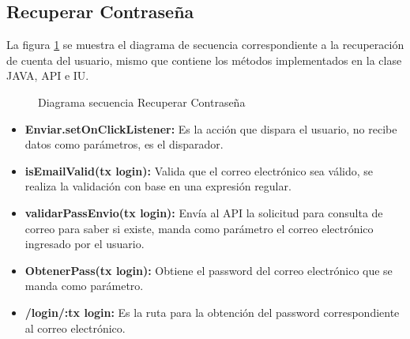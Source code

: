 \subsection{Recuperar Contraseña}

La figura \ref{fig:SecuenciaRecupera} se muestra el diagrama de secuencia correspondiente a la recuperación de cuenta del usuario, mismo que contiene los métodos implementados en la clase JAVA, API e IU.

\begin{figure}[htbp!]
	\centering
	\caption{Diagrama secuencia Recuperar Contraseña}
	\label{fig:SecuenciaRecupera}
\end{figure}

\begin{itemize}
	\item \textbf{Enviar.setOnClickListener:} Es la acción que dispara el usuario, no recibe datos como parámetros, es el disparador.
	\item \textbf{isEmailValid(tx login):}  Valida que el correo electrónico sea válido, se realiza la validación con base en una expresión regular.
	\item \textbf{validarPassEnvio(tx login):} Envía al API la solicitud para consulta de correo para saber si existe, manda como parámetro el correo electrónico ingresado por el usuario.
	\item \textbf{ObtenerPass(tx login):} Obtiene el password del correo electrónico que se manda como parámetro.
	\item \textbf{/login/:tx login:} Es la ruta para la obtención del password correspondiente al correo electrónico. 
\end{itemize}



